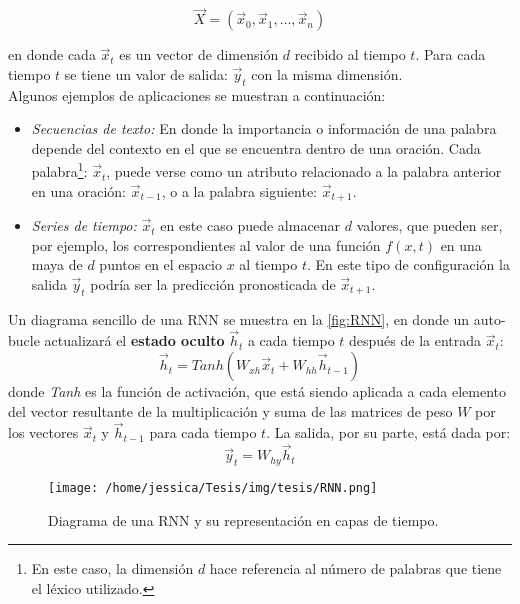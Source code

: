 \begin{equation}
  \label{eq:xdataRNN}
  \vec{X} = (\vec{x}_0, \vec{x}_1, \dots , \vec{x}_n)
\end{equation}

en donde cada $\vec{x}_t$ es un vector de dimensión $d$ recibido al tiempo $t$. Para cada tiempo $t$ se tiene un valor de salida: $\vec{y}_t$ con la misma dimensión.
\\
Algunos ejemplos de aplicaciones se muestran a continuación:

\begin{itemize}[label=\textcolor{CTtitle}{\textbullet}]
\item \emph{Secuencias de texto:} En donde la importancia o información de una palabra depende del contexto en el que se encuentra dentro de una oración. Cada palabra\footnote{En este caso, la dimensión $d$ hace referencia al número de palabras que tiene el léxico utilizado.}: $\vec{x}_t$,  puede verse como un atributo relacionado a la palabra anterior en una oración: $\vec{x}_{t-1}$, o a la palabra siguiente: $\vec{x}_{t+1}$.
 \item \emph{Series de tiempo:} $\vec{x}_t$ en este caso puede almacenar $d$ valores, que pueden ser, por ejemplo, los correspondientes al valor de una función $f(x,t)$ en una maya de $d$ puntos en el espacio $x$ al tiempo $t$. En este tipo de configuración la salida $\vec{y}_t$ podría ser la predicción pronosticada de $\vec{x}_{t+1}$.
 \end{itemize}
  
Un diagrama sencillo de una \acs{RNN} se muestra en la \autoref{fig:RNN}, en donde un auto-bucle actualizará el \textbf{estado oculto} $\vec{h}_t$ a cada tiempo $t$ después de la entrada $\vec{x}_t$:
\begin{equation}
  \label{eq:hidden}
  \vec{h}_t = Tanh(W_{xh}\vec{x}_t + W_{hh} \vec{h}_{t-1})
\end{equation}
donde \emph{Tanh} es la función de activación, que está siendo aplicada a cada elemento del vector resultante de la multiplicación y suma de las matrices de peso $W$ por los vectores $\vec{x}_t$ y $\vec{h}_{t-1}$ para cada tiempo $t$. La salida, por su parte, está dada por:
\begin{equation}
  \vec{y}_t = W_{hy}\vec{h}_t
\end{equation}

\begin{figure}[!htbp]
  \centering
  \texttt{[image: /home/jessica/Tesis/img/tesis/RNN.png]}
  \caption{Diagrama de una \acs{RNN} y su representación en capas de tiempo.}
  \label{fig:RNN}
\end{figure}

